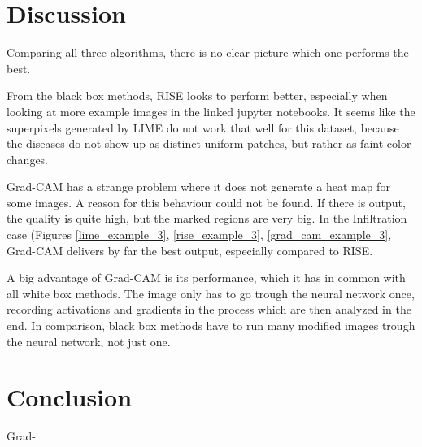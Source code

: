 \section{Discussion}
Comparing all three algorithms, there is no clear picture which one performs the best.

From the black box methods, RISE looks to perform better, especially when looking at more example images in the linked jupyter notebooks. It seems like
the superpixels generated by LIME do not work that well for this dataset, because the diseases do not show up as distinct uniform patches, but rather as faint color changes.

Grad-CAM has a strange problem where it does not generate a heat map for some images. A reason for this behaviour could not be found. If there is output,
the quality is quite high, but the marked regions are very big. In the Infiltration case (Figures \ref{lime_example_3}, \ref{rise_example_3}, \ref{grad_cam_example_3}, Grad-CAM delivers by far
the best output, especially compared to RISE.

A big advantage of Grad-CAM is its performance, which it has in common with all white box methods. The image only has to go trough the neural network once, recording activations and gradients in the process which are then analyzed in the end. In comparison, black box methods have to run many modified images trough the neural network, not just one.

\section{Conclusion}
Grad-